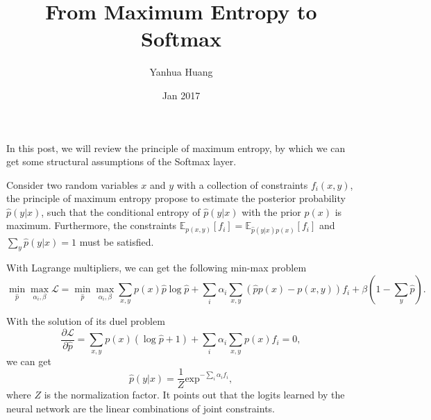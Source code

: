 \documentclass[a4paper,11pt]{article}
\begin{document}
\title{From Maximum Entropy to Softmax}
\author{Yanhua Huang}
\date{Jan 2017}
\maketitle

In this post, we will review the principle of maximum entropy, by which we can get some structural assumptions of the Softmax layer.

Consider two random variables $x$ and $y$ with a collection of constraints $f_i(x, y)$, the principle of maximum entropy propose to estimate the 
posterior probability $\hat{p}(y|x)$, such that the conditional entropy of $\hat{p}(y|x)$ with the prior $p(x)$ is maximum. Furthermore, the constraints $\mathbb{E}_{p(x, y)}[f_i] = \mathbb{E}_{\hat{p}(y|x)p(x)}[f_i]$ and $\sum_{y}{\hat{p}(y|x)} = 1$ must be satisfied.

With Lagrange multipliers, we can get the following min-max problem
\begin{equation}
\min_{\hat{p}}\max_{\alpha_i, \beta} \mathcal{L} = \min_{\hat{p}}\max_{\alpha_i, \beta} \sum_{x,y}{p(x)\hat{p}\log{\hat{p} + \sum_{i}{\alpha_i\sum_{x,y}(\hat{p}p(x) - p(x,y))f_i}} + \beta(1 - \sum_{y}{\hat{p}})}.
\end{equation}

With the solution of its duel problem
\begin{equation}
\frac{\partial \mathcal{L}}{\partial \hat{p}} = \sum_{x,y}p(x)(\log\hat{p} + 1) + \sum_i{\alpha_i\sum_{x,y}{p(x)f_i}} = 0,
\end{equation}
we can get 
\begin{equation}
\hat{p}(y|x) = \frac{1}{Z}\text{exp}^{-\sum_i{\alpha_i f_i}},
\end{equation} 
where $Z$ is the normalization factor. It points out that the logits learned by the neural network are the linear combinations of joint constraints.
\end{document}
